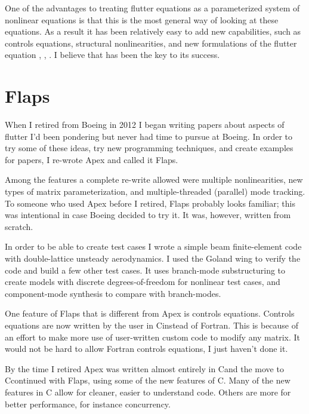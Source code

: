 \documentclass[11pt]{article}
\def\Cpp{{C\nolinebreak[4]\hspace{-.05em}\raisebox{.4ex}{\tiny\bf ++}}\:}
\begin{document}
One of the advantages to treating flutter equations as a parameterized
system of nonlinear equations is that this is the most general way of
looking at these equations.
As a result it has been relatively easy to add new capabilities, such as
controls equations, structural nonlinearities, and new formulations of the flutter
equation
\cite{hassig1971approximate},
\cite{chen2000damping}, \cite{edwards2008flutter}.
I believe that has been the key to its success.

\section{Flaps}
When I retired from Boeing in 2012 I began writing papers about
aspects of flutter I'd been pondering but never had time to pursue
at Boeing. In order to try some of these ideas, try new
programming techniques, and create examples for papers, I re-wrote Apex
and called it Flaps.

Among the features a complete re-write allowed were multiple nonlinearities,
new types of matrix parameterization, and multiple-threaded
(parallel) mode tracking.
To someone who used Apex before I retired, Flaps probably
looks familiar; this was intentional in case Boeing decided to try it.
It was, however, written from scratch.

In order to be able to create test cases I wrote a simple beam
finite-element code with double-lattice unsteady aerodynamics. I used
the Goland wing to verify the code and build a few other test cases.
It uses branch-mode substructuring to create models with discrete
degrees-of-freedom for nonlinear test cases, and component-mode
synthesis to compare with branch-modes.

One feature of Flaps that is different from Apex is controls equations.
Controls equations are now written by the user in \Cpp instead of
Fortran. This is because of an effort to make more use of user-written
custom code to modify any matrix. It would not be hard to allow
Fortran controls equations, I just haven't done it.


By the time I retired Apex was written almost entirely in \Cpp and
the move to \Cpp continued with Flaps, using some of the new features
of \Cpp -11.
Many of the new features in \Cpp -11 allow for cleaner, easier to
understand code. Others are more for better performance, for instance
concurrency.
\end{document}

